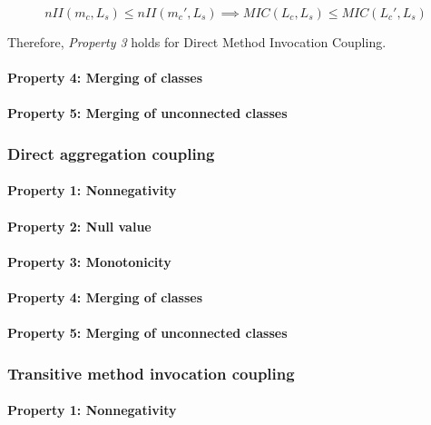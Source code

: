 \begin{equation*}
   nII(m_c, L_s) \le nII(m_c', L_s) \implies MIC(L_c, L_s) \le MIC(L_c', L_s)
\end{equation*}

\blankls
Therefore, \textit{Property 3} holds for Direct Method Invocation Coupling.

\paragraph{Property 4: Merging of classes}

\paragraph{Property 5: Merging of unconnected classes}

\subsubsection{Direct aggregation coupling}
\paragraph{Property 1: Nonnegativity}

\paragraph{Property 2: Null value}

\paragraph{Property 3: Monotonicity}

\paragraph{Property 4: Merging of classes}

\paragraph{Property 5: Merging of unconnected classes}

\subsubsection{Transitive method invocation coupling}
\paragraph{Property 1: Nonnegativity}

